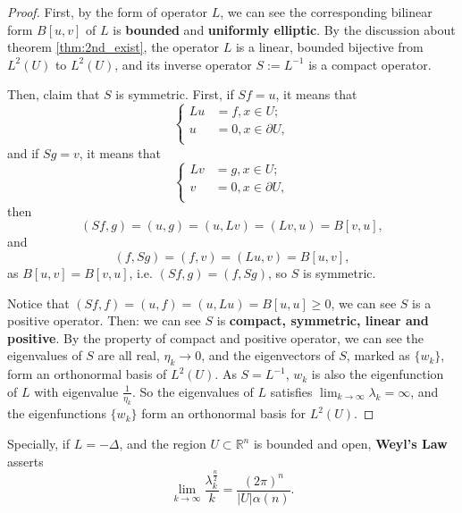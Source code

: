 \begin{proof}
    First, by the form of operator $L$, we can see the corresponding bilinear form $B[u,v]$ of $L$ is \textbf{bounded} and \textbf{uniformly elliptic}. By the discussion about theorem \ref{thm:2nd_exist}, the operator $L$ is a linear, bounded bijective from $L^{2}(U)$ to $L^{2}(U)$, and its inverse operator $S:=L^{-1}$ is a compact operator.

    Then, claim that $S$ is symmetric. First, if $Sf=u$, it means that 
    \begin{equation}
        \label{eq:Sf}
        \left\{
            \begin{aligned}
                Lu&=f,x\in U;\\
                u&=0,x\in\partial U,\\
            \end{aligned}
        \right.
    \end{equation}
    and if $Sg=v$, it means that 
    \begin{equation}
        \label{eq:Sg}
        \left\{
            \begin{aligned}
                Lv&=g,x\in U;\\
                v&=0,x\in\partial U,\\
            \end{aligned}
        \right.
    \end{equation}
    then 
    \begin{equation}
        (Sf,g)=(u,g)=(u,Lv)=(Lv,u)=B[v,u],
    \end{equation}
    and 
    \begin{equation}
        (f,Sg)=(f,v)=(Lu,v)=B[u,v],
    \end{equation}
    as $B[u,v]=B[v,u]$, i.e. $(Sf,g)=(f,Sg)$, so $S$ is symmetric.

    Notice that $(Sf,f)=(u,f)=(u,Lu)=B[u,u]\ge 0$, we can see $S$ is a positive operator. Then: we can see $S$ is \textbf{compact, symmetric, linear and positive}. By the property of compact and positive operator, we can see the eigenvalues of $S$ are all real, $\eta_{k}\rightarrow 0$, and the eigenvectors of $S$, marked as $\{w_{k}\}$, form an orthonormal basis of $L^{2}(U)$. As $S=L^{-1}$, $w_{k}$ is also the eigenfunction of $L$ with eigenvalue $\frac{1}{\eta_{k}}$. So the eigenvalues of $L$ satisfies $\lim_{k\rightarrow\infty}\lambda_{k}=\infty$, and the eigenfunctions $\{w_{k}\}$ form an orthonormal basis for $L^{2}(U)$.
\end{proof}
\begin{remark}
    Specially, if $L=-\Delta$, and the region $U\subset\mathbb{R}^{n}$ is bounded and open, \textbf{Weyl's Law} asserts
    \begin{equation}
        \lim_{k\rightarrow\infty}\frac{\lambda_{k}^{\frac{n}{2}}}{k}=\frac{(2\pi)^{n}}{|U|\alpha(n)}. 
    \end{equation}
\end{remark}
